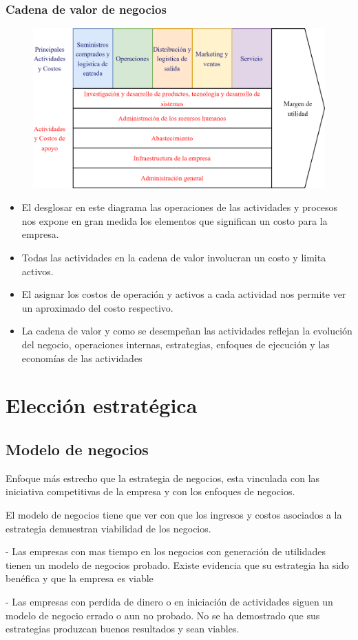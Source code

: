 \documentclass{templateNote}
\newcommand{\newparagraph}{\par\vspace{\baselineskip}\noindent}
\begin{document}
\newpage
\subsubsection{Cadena de valor de negocios}
\begin{figure}[H]
    \centering
    \includegraphics[width=1\textwidth]{img/costosdenoseque.png}
\end{figure}

\begin{itemize}
    \item El desglosar en este diagrama las operaciones de las actividades y procesos nos expone en gran medida los elementos que significan un costo para la empresa.
    \item Todas las actividades en la cadena de valor involucran un costo y limita activos.
    \item El asignar los costos de operación y activos a cada actividad nos permite ver un aproximado del costo respectivo.
    \item La cadena de valor y como se desempeñan las actividades reflejan la evolución del negocio, operaciones internas, estrategias, enfoques de ejecución y las economías de las actividades
\end{itemize}

\newpage
\section{Elección estratégica}\label{sec:eleccionEstrategica}
\subsection{Modelo de negocios}
Enfoque m\'as estrecho que la estrategia de negocios, esta vinculada con las iniciativa competitivas de la empresa y con los enfoques de negocios.
\newparagraph
El modelo de negocios tiene que ver con que los ingresos y costos asociados a la estrategia demuestran viabilidad de los negocios.
\newparagraph
\subitem - Las empresas con mas tiempo en los negocios con generación de utilidades tienen un modelo de negocios probado. Existe evidencia que su estrategia ha sido benéfica y que la empresa es viable
\newparagraph
\subitem - Las empresas con perdida de dinero o en iniciación de actividades siguen un modelo de negocio errado o aun no probado. No se ha demostrado que sus estrategias produzcan buenos resultados y sean viables.
\end{document}
